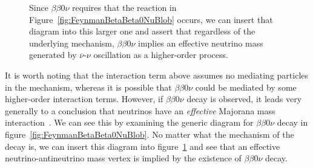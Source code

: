 \begin{figure}
\begin{center}
\end{center}
\caption{Since $\beta\beta 0\nu$ requires that the reaction in Figure~\ref{fig:FeynmanBetaBeta0NuBlob} occurs, we can insert that diagram into this larger one and assert that regardless of the underlying mechanism, $\beta\beta 0\nu$ implies an effective neutrino mass generated by $\overline{\nu}$-$\nu$ oscillation as a higher-order process.}
\label{fig:FeynmanBetaBeta0NuImplication}
\end{figure}

It is worth noting that the interaction term above assumes no mediating particles in the mechanism, whereas it is possible that $\beta\beta 0\nu$ could be mediated by some higher-order interaction terms.  However, if $\beta\beta 0\nu$ decay is observed, it leads very generally to a conclusion that neutrinos have an \emph{effective} Majorana mass interaction~\cite{BlackBoxTheorem}.  We can see this by examining the generic diagram for $\beta\beta 0\nu$ decay in figure~\ref{fig:FeynmanBetaBeta0NuBlob}.  No matter what the mechanism of the decay is, we can insert this diagram into figure~\ref{fig:FeynmanBetaBeta0NuImplication} and see that an effective neutrino-antineutrino mass vertex is implied by the existence of $\beta\beta 0\nu$ decay.

